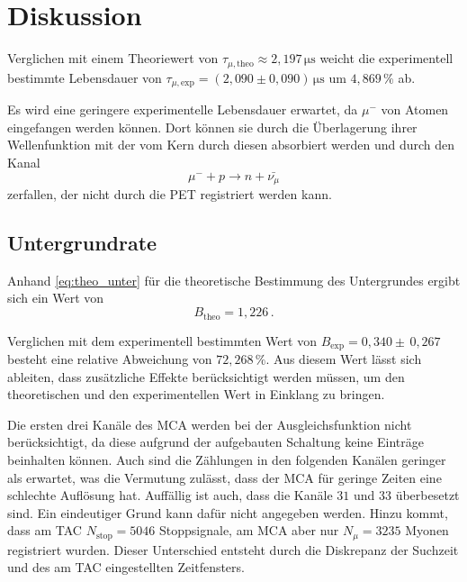 \section{Diskussion}
\label{sec:Diskussion}


Verglichen mit einem Theoriewert von $\tau_{\mu,\text{theo}} \approx 2,197 \,\unit{\micro\second}$ \cite{pdg} weicht die experimentell bestimmte Lebensdauer von
$\tau_{\mu,\text{exp}} =  \left(2,090  \pm 0,090 \right) \,\unit{\micro\second}$ um $4,869 \,\%$  ab.

Es wird eine geringere experimentelle Lebensdauer erwartet, da $\mu^{-}$ von Atomen eingefangen werden können. 
Dort können sie durch die Überlagerung ihrer Wellenfunktion mit der vom Kern durch diesen absorbiert werden und durch den Kanal
\begin{equation*}
    \mu^{-} +  p \rightarrow  n + \bar{{\nu}_\mu}
\end{equation*}
zerfallen, der nicht durch die PET registriert werden kann.

\subsection{Untergrundrate}

Anhand \eqref{eq:theo_unter} für die theoretische Bestimmung des Untergrundes ergibt sich ein Wert von
\begin{equation*}
    B_\text{theo} = 1,226 \,.
\end{equation*}

Verglichen mit dem experimentell bestimmten Wert von $B_\text{exp} = 0,340 \pm \, 0,267$ besteht eine relative Abweichung von
$72,268 \,\%$. Aus diesem Wert lässt sich ableiten, dass zusätzliche Effekte berücksichtigt werden müssen, um den theoretischen und den experimentellen Wert in Einklang zu bringen.

Die ersten drei Kanäle des MCA werden bei der Ausgleichsfunktion nicht berücksichtigt, da diese aufgrund der aufgebauten Schaltung keine Einträge beinhalten können.
Auch sind die Zählungen in den folgenden Kanälen geringer als erwartet, was die Vermutung zulässt, dass der MCA für geringe Zeiten eine schlechte Auflösung hat.
Auffällig ist auch, dass die Kanäle $31$ und $33$ überbesetzt sind. Ein eindeutiger Grund kann dafür nicht angegeben werden.
Hinzu kommt, dass am TAC $N_\text{stop} = 5046$ Stoppsignale, am MCA aber nur $N_{\mu} = 3235$ Myonen registriert wurden.
Dieser Unterschied entsteht durch die Diskrepanz der Suchzeit und des am TAC eingestellten Zeitfensters.



